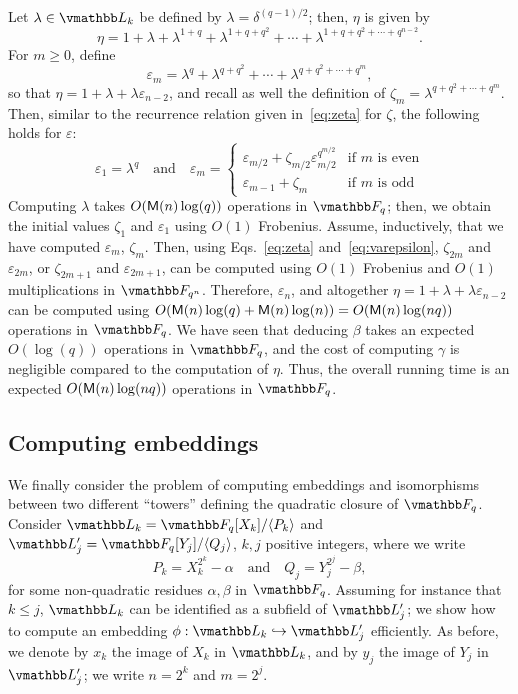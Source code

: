 Let $\lambda \in \L_k$ be defined by $\lambda = \delta^{(q - 1) /
  2}$; then, $\eta$ is given by
$$
\eta = 1 + \lambda + \lambda^{1 + q} + \lambda^{1 + q + q^2} + \cdots + \lambda^{1 + q + q^2 + \cdots + q^{n-2}}.
$$
For $m \ge 0$, define 
$$\varepsilon_m = \lambda^{q} + \lambda^{q + q^2} + \cdots +
\lambda^{q + q^2 + \cdots + q^m},$$ so that $\eta= 1 + \lambda+
\lambda \varepsilon_{n-2}$, and recall as well the definition of
$\zeta_m = \lambda^{q + q^2 + \cdots + q^m}.$ Then, similar to the
recurrence relation given in~\eqref{eq:zeta} for $\zeta$, the following
holds for $\varepsilon$:
\begin{equation}\label{eq:varepsilon}
\varepsilon_1 =
\lambda^q \quad\text{and}\quad 
\varepsilon_m = 
\begin{cases}
\varepsilon_{m / 2} + \zeta_{m / 2}\varepsilon_{m / 2}^{q^{m / 2}} & \text{if $m$ is even}  \\
\varepsilon_{m-1} + \zeta_m & \text{if $m$ is odd}
\end{cases}  
\end{equation}
Computing $\lambda$ takes $O(\mathsf{M}(n)\log(q))$ operations in $\F_q$;
then, we obtain the initial values $\zeta_1$ and $\varepsilon_1$ using
$O(1)$ Frobenius. Assume, inductively, that we have computed
$\varepsilon_m$, $\zeta_m$. Then, using Eqs.~\eqref{eq:zeta}
and~\eqref{eq:varepsilon}, $\zeta_{2m}$ and $\varepsilon_{2m}$, or
$\zeta_{2m+1}$ and $\varepsilon_{2m+1}$, can be computed using $O(1)$
Frobenius and $O(1)$ multiplications in $\F_{q^n}$. Therefore,
$\varepsilon_n$, and altogether $\eta =
1+\lambda+\lambda\varepsilon_{n-2}$ can be computed using
$O(\mathsf{M}(n)\log(q)+\mathsf{M}(n)\log(n))=O(\mathsf{M}(n)\log(nq))$ operations in $\F_q$.
We have seen that deducing $\beta$ takes an expected $O(\log(q))$
operations in $\F_q$, and the cost of computing $\gamma$ is negligible
compared to the computation of $\eta$. Thus, the overall running time
is an expected $O(\mathsf{M}(n)\log(nq))$ operations in $\F_q$.


\subsection{Computing embeddings}

We finally consider the problem of computing embeddings and
isomorphisms between two different ``towers'' defining the quadratic
closure of $\F_q$.  Consider $\L_k = \F_q[X_k]/\langle P_k \rangle$
and $\L'_j = \F_q[Y_j]/\langle Q_j\rangle$,  $k, j$ positive
integers, where we write
$$P_k = X_k^{2^k} - \alpha\quad\text{and}\quad Q_j = Y_j^{2^j} -
\beta,$$ for some non-quadratic residues $\alpha,\beta$ in $\F_q$.
Assuming for instance that $k \le j$, $\L_k$ can be identified as a
subfield of $\L'_j$; we show how to compute an embedding $\phi : \L_k
\hookrightarrow \L'_j$ efficiently. As before, we denote by $x_k$ the
image of $X_k$ in $\L_k$, and by $y_j$ the image of $Y_j$ in $\L'_j$;
we write $n=2^k$ and $m=2^j$.


